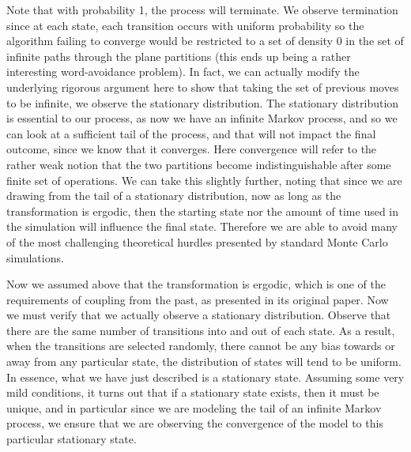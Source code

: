 Note that with probability 1, the process will terminate. We observe termination since at each state, each transition occurs with uniform probability so the algorithm failing to converge would be restricted to a set of density 0 in the set of infinite paths through the plane partitions (this ends up being a rather interesting word-avoidance problem). In fact, we can actually modify the underlying rigorous argument here to show that taking the set of previous moves to be infinite, we observe the stationary distribution. The stationary distribution is essential to our process, as now we have an infinite Markov process, and so we can look at a sufficient tail of the process, and that will not impact the final outcome, since we know that it converges. Here convergence will refer to the rather weak notion that the two partitions become indistinguishable after some finite set of operations. We can take this slightly further, noting that since we are drawing from the tail of a stationary distribution, now as long as the transformation is ergodic, then the starting state nor the amount of time used in the simulation will influence the final state. Therefore we are able to avoid many of the most challenging theoretical hurdles presented by standard Monte Carlo simulations.

Now we assumed above that the transformation is ergodic, which is one of the requirements of coupling from the past, as presented in its original paper. Now we must verify that we actually observe a stationary distribution. Observe that there are the same number of transitions into and out of each state. As a result, when the transitions are selected randomly, there cannot be any bias towards or away from any particular state, the distribution of states will tend to be uniform. In essence, what we have just described is a stationary state. Assuming some very mild conditions, it turns out that if a stationary state exists, then it must be unique, and in particular since we are modeling the tail of an infinite Markov process, we ensure that we are observing the convergence of the model to this particular stationary state. 

\newpage
\printbibliography

